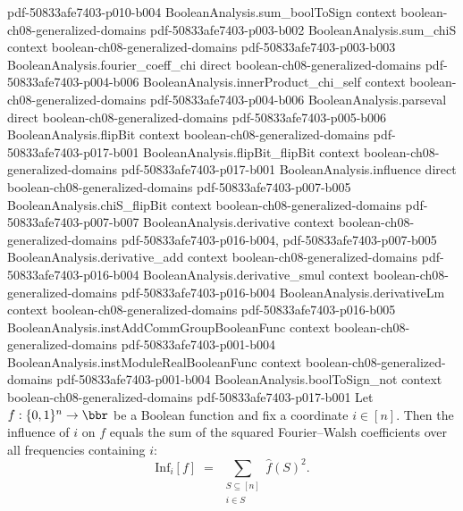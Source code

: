 \begin{theorem}
{    pdf-50833afe7403-p010-b004}
\proofstep
  {BooleanAnalysis.sum_boolToSign}
  {context}
  {boolean-ch08-generalized-domains}
  {pdf-50833afe7403-p003-b002}
\proofstep
  {BooleanAnalysis.sum_chiS}
  {context}
  {boolean-ch08-generalized-domains}
  {pdf-50833afe7403-p003-b003}
\proofstep
  {BooleanAnalysis.fourier_coeff_chi}
  {direct}
  {boolean-ch08-generalized-domains}
  {pdf-50833afe7403-p004-b006}
\proofstep
  {BooleanAnalysis.innerProduct_chi_self}
  {context}
  {boolean-ch08-generalized-domains}
  {pdf-50833afe7403-p004-b006}
\proofstep
  {BooleanAnalysis.parseval}
  {direct}
  {boolean-ch08-generalized-domains}
  {pdf-50833afe7403-p005-b006}
\proofstep
  {BooleanAnalysis.flipBit}
  {context}
  {boolean-ch08-generalized-domains}
  {pdf-50833afe7403-p017-b001}
\proofstep
  {BooleanAnalysis.flipBit_flipBit}
  {context}
  {boolean-ch08-generalized-domains}
  {pdf-50833afe7403-p017-b001}
\proofstep
  {BooleanAnalysis.influence}
  {direct}
  {boolean-ch08-generalized-domains}
  {pdf-50833afe7403-p007-b005}
\proofstep
  {BooleanAnalysis.chiS_flipBit}
  {context}
  {boolean-ch08-generalized-domains}
  {pdf-50833afe7403-p007-b007}
\proofstep
  {BooleanAnalysis.derivative}
  {context}
  {boolean-ch08-generalized-domains}
  {pdf-50833afe7403-p016-b004,
    pdf-50833afe7403-p007-b005}
\proofstep
  {BooleanAnalysis.derivative_add}
  {context}
  {boolean-ch08-generalized-domains}
  {pdf-50833afe7403-p016-b004}
\proofstep
  {BooleanAnalysis.derivative_smul}
  {context}
  {boolean-ch08-generalized-domains}
  {pdf-50833afe7403-p016-b004}
\proofstep
  {BooleanAnalysis.derivativeLm}
  {context}
  {boolean-ch08-generalized-domains}
  {pdf-50833afe7403-p016-b005}
\proofstep
  {BooleanAnalysis.instAddCommGroupBooleanFunc}
  {context}
  {boolean-ch08-generalized-domains}
  {pdf-50833afe7403-p001-b004}
\proofstep
  {BooleanAnalysis.instModuleRealBooleanFunc}
  {context}
  {boolean-ch08-generalized-domains}
  {pdf-50833afe7403-p001-b004}
\proofstep
  {BooleanAnalysis.boolToSign_not}
  {context}
  {boolean-ch08-generalized-domains}
  {pdf-50833afe7403-p017-b001}
Let $f:\{0,1\}^n\to\bbr$ be a Boolean function and fix a coordinate $i\in[n]$. Then the
influence of $i$ on $f$ equals the sum of the squared Fourier--Walsh coefficients over
all frequencies containing $i$:
\[
  \mathrm{Inf}_i[f] \;=\; \sum_{\substack{S\subseteq[n]\\ i\in S}} \hat f(S)^2.
\]
\end{theorem}

